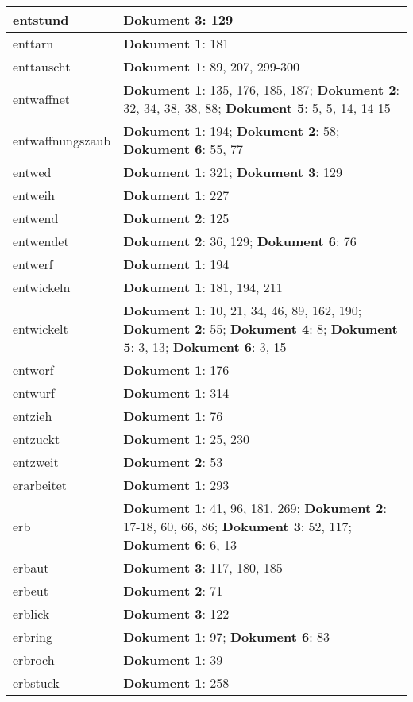 \documentclass[a5paper]{article}
\begin{document}
\begin{longtable}[l]{|l|p{3in}|}
\hline
entstund & \textbf{Dokument 3}: 129 \\
\hline
enttarn & \textbf{Dokument 1}: 181 \\
\hline
enttauscht & \textbf{Dokument 1}: 89, 207, 299-300 \\
\hline
entwaffnet & \textbf{Dokument 1}: 135, 176, 185, 187; \textbf{Dokument 2}: 32, 34, 38, 38, 88; \textbf{Dokument 5}: 5, 5, 14, 14-15 \\
\hline
entwaffnungszaub & \textbf{Dokument 1}: 194; \textbf{Dokument 2}: 58; \textbf{Dokument 6}: 55, 77 \\
\hline
entwed & \textbf{Dokument 1}: 321; \textbf{Dokument 3}: 129 \\
\hline
entweih & \textbf{Dokument 1}: 227 \\
\hline
entwend & \textbf{Dokument 2}: 125 \\
\hline
entwendet & \textbf{Dokument 2}: 36, 129; \textbf{Dokument 6}: 76 \\
\hline
entwerf & \textbf{Dokument 1}: 194 \\
\hline
entwickeln & \textbf{Dokument 1}: 181, 194, 211 \\
\hline
entwickelt & \textbf{Dokument 1}: 10, 21, 34, 46, 89, 162, 190; \textbf{Dokument 2}: 55; \textbf{Dokument 4}: 8; \textbf{Dokument 5}: 3, 13; \textbf{Dokument 6}: 3, 15 \\
\hline
entworf & \textbf{Dokument 1}: 176 \\
\hline
entwurf & \textbf{Dokument 1}: 314 \\
\hline
entzieh & \textbf{Dokument 1}: 76 \\
\hline
entzuckt & \textbf{Dokument 1}: 25, 230 \\
\hline
entzweit & \textbf{Dokument 2}: 53 \\
\hline
erarbeitet & \textbf{Dokument 1}: 293 \\
\hline
erb & \textbf{Dokument 1}: 41, 96, 181, 269; \textbf{Dokument 2}: 17-18, 60, 66, 86; \textbf{Dokument 3}: 52, 117; \textbf{Dokument 6}: 6, 13 \\
\hline
erbaut & \textbf{Dokument 3}: 117, 180, 185 \\
\hline
erbeut & \textbf{Dokument 2}: 71 \\
\hline
erblick & \textbf{Dokument 3}: 122 \\
\hline
erbring & \textbf{Dokument 1}: 97; \textbf{Dokument 6}: 83 \\
\hline
erbroch & \textbf{Dokument 1}: 39 \\
\hline
erbstuck & \textbf{Dokument 1}: 258 \\

\end{longtable}
\end{document}
